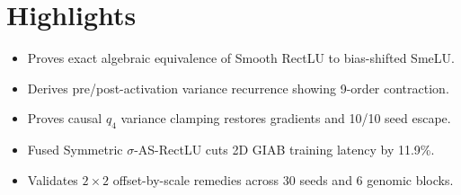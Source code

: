 \documentclass[11pt, a4paper]{article}
\begin{document}
\section*{Highlights}
\begin{itemize}
    \item Proves exact algebraic equivalence of Smooth RectLU to bias-shifted SmeLU.
    \item Derives pre/post-activation variance recurrence showing 9-order contraction.
    \item Proves causal $q_4$ variance clamping restores gradients and 10/10 seed escape.
    \item Fused Symmetric $\sigma$-AS-RectLU cuts 2D GIAB training latency by 11.9\%.
    \item Validates $2\times 2$ offset-by-scale remedies across 30 seeds and 6 genomic blocks.
\end{itemize}
\end{document}
